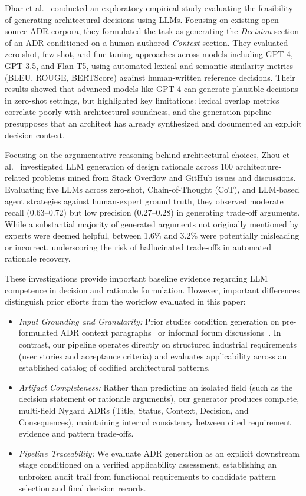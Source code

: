 Dhar et al.~\cite{dhar2024generating} conducted an exploratory empirical study
evaluating the feasibility of generating architectural decisions using LLMs.
Focusing on existing open-source ADR corpora, they formulated the task as
generating the \emph{Decision} section of an ADR conditioned on a human-authored
\emph{Context} section. They evaluated zero-shot, few-shot, and fine-tuning
approaches across models including GPT-4, GPT-3.5, and Flan-T5, using automated
lexical and semantic similarity metrics (BLEU, ROUGE, BERTScore) against
human-written reference decisions. Their results showed that advanced models like
GPT-4 can generate plausible decisions in zero-shot settings, but highlighted
key limitations: lexical overlap metrics correlate poorly with architectural
soundness, and the generation pipeline presupposes that an architect has
already synthesized and documented an explicit decision context.

Focusing on the argumentative reasoning behind architectural choices,
Zhou et al.~\cite{zhou2026rationale} investigated LLM generation of design
rationale across 100 architecture-related problems mined from Stack Overflow
and GitHub issues and discussions. Evaluating five LLMs across zero-shot,
Chain-of-Thought (CoT), and LLM-based agent strategies against human-expert
ground truth, they observed moderate recall (0.63--0.72) but low precision
(0.27--0.28) in generating trade-off arguments. While a substantial majority of
generated arguments not originally mentioned by experts were deemed helpful,
between 1.6\% and 3.2\% were potentially misleading or incorrect, underscoring
the risk of hallucinated trade-offs in automated rationale recovery.

These investigations provide important baseline evidence regarding LLM
competence in decision and rationale formulation. However, important differences
distinguish prior efforts from the workflow evaluated in this paper:
\begin{itemize}
    \item \emph{Input Grounding and Granularity:} Prior studies condition
    generation on pre-formulated ADR context paragraphs~\cite{dhar2024generating}
    or informal forum discussions~\cite{zhou2026rationale}. In contrast, our
    pipeline operates directly on structured industrial requirements (user
    stories and acceptance criteria) and evaluates applicability across an
    established catalog of codified architectural patterns.
    \item \emph{Artifact Completeness:} Rather than predicting an isolated
    field (such as the decision statement or rationale arguments), our
    generator produces complete, multi-field Nygard ADRs (Title, Status,
    Context, Decision, and Consequences), maintaining internal consistency
    between cited requirement evidence and pattern trade-offs.
    \item \emph{Pipeline Traceability:} We evaluate ADR generation as an
    explicit downstream stage conditioned on a verified applicability
    assessment, establishing an unbroken audit trail from functional
    requirements to candidate pattern selection and final decision records.
\end{itemize}

